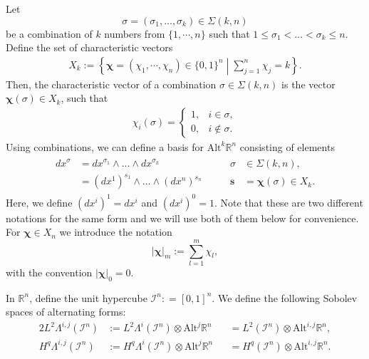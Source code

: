 \documentclass[final]{amsart}%
\newcommand{\charset}{X}
\newcommand{\charvec}{\bm\chi}
\newcommand{\0}{\mathaccent23}
\newcommand \alt{\mathrm{Alt}}
\newcommand\R{\mathbb{R}}
\begin{document}
Let $$\sigma = (\sigma_1,\dots,\sigma_k)\in\Sigma(k,n)$$ be a combination of $k$ numbers from 
$\{1,\cdots,n\}$ such that $1\le \sigma_1<\dots<\sigma_k\le n$. Define the set of characteristic vectors
\begin{gather}
\charset_{k}:=\left\{
    \bm{\chi}=(\chi_{1}, \cdots, \chi_{n})\in \{0, 1\}^{n} \middle| \sum_{j=1}^{n} \chi_{j}=k
    \right\}.
\end{gather}
Then, the characteristic vector of a combination $\sigma\in\Sigma(k,n)$ is the vector $\charvec(\sigma)\in\charset_{k}$, such that
\begin{gather*}
    \chi_i(\sigma)=
    \begin{cases}
    1, & i\in\sigma,\\
    0, & i \not\in\sigma.
    \end{cases}
\end{gather*}
Using combinations, we can define a basis for $\alt^k\R^n$ consisting of elements
\begin{gather}
\label{eq:form-basis}
\begin{aligned}
    dx^\sigma &= dx^{\sigma_1} \wedge \dots \wedge dx^{\sigma_k}
    &\sigma&\in\Sigma(k,n),\\
    &= (dx^1)^{s_1} \wedge\dots\wedge (dx^n)^{s_n}
    \qquad
    &\bm s&=\charvec(\sigma)\in\charset_{k}.
\end{aligned}   
\end{gather}
Here, we define $(dx^i)^1 = dx^i$ and $(dx^i)^0 = 1$. Note that these are two different notations for the same form and we will use both of them below for convenience. 
For $\charvec\in\charset_{n}$ we introduce the notation 
\begin{equation}
    \label{eq:Iell}
    |\charvec|_{m}:=\sum_{l=1}^{m} \chi_{l},
\end{equation} 
with the convention $|\charvec|_{0}=0$.

In $\mathbb R^{n}$, define the unit hypercube $\mathcal{I}^n: =[0, 1]^n$. We define the following Sobolev spaces of alternating forms:
\begin{alignat*}2
L^{2}\Lambda^{i, j}(\mathcal{I}^n)
&:=L^2\Lambda^i(\mathcal{I}^n)\otimes \alt^{j}\mathbb R^{n}
&&=L^{2}(\mathcal{I}^n)\otimes \alt^{i,j}\mathbb R^{n},
\\
H^{q}\Lambda^{i, j}(\mathcal{I}^n)
&:=H^q\Lambda^i(\mathcal{I}^n)\otimes \alt^{j}\mathbb R^{n}
&&=H^{q}(\mathcal{I}^n)\otimes \alt^{i,j}\mathbb R^{n}. 
\end{alignat*}
\end{document}
